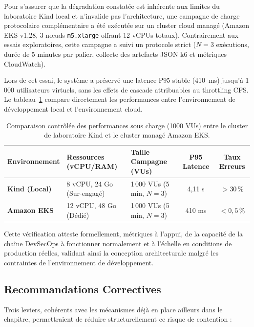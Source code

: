 Pour s'assurer que la dégradation constatée est inhérente aux limites du laboratoire Kind local et n'invalide pas l'architecture, une campagne de charge protocolaire complémentaire a été exécutée sur un cluster cloud managé (Amazon EKS v1.28, 3 nœuds \texttt{m5.xlarge} offrant 12 vCPUs totaux). Contrairement aux essais exploratoires, cette campagne a suivi un protocole strict ($N=3$ exécutions, durée de 5 minutes par palier, collecte des artefacts JSON k6 et métriques CloudWatch). 

Lors de cet essai, le système a préservé une latence P95 stable (410~ms) jusqu'à 1\,000 utilisateurs virtuels, sans les effets de cascade attribuables au throttling CFS. Le tableau~\ref{tab:kind_vs_eks} compare directement les performances entre l'environnement de développement local et l'environnement cloud.

\begin{table}[H]
\centering
\footnotesize
\begin{tabular}{l p{4cm} p{4cm} c c}
\toprule
\textbf{Environnement} & \textbf{Ressources (vCPU/RAM)} & \textbf{Taille Campagne (VUs)} & \textbf{P95 Latence} & \textbf{Taux Erreurs} \\
\midrule
\textbf{Kind (Local)} & 8 vCPU, 24 Go (Sur-engagé) & 1\,000 VUs (5 min, $N=3$) & 4,11 s & $> 30\,\%$ \\
\textbf{Amazon EKS} & 12 vCPU, 48 Go (Dédié) & 1\,000 VUs (5 min, $N=3$) & 410 ms & $< 0,5\,\%$ \\
\bottomrule
\end{tabular}
\caption{Comparaison contrôlée des performances sous charge (1000 VUs) entre le cluster de laboratoire Kind et le cluster managé Amazon EKS.}
\label{tab:kind_vs_eks}
\end{table}

Cette vérification atteste formellement, métriques à l'appui, de la capacité de la chaîne DevSecOps à fonctionner normalement et à l'échelle en conditions de production réelles, validant ainsi la conception architecturale malgré les contraintes de l'environnement de développement.

\subsection{Recommandations Correctives}

Trois leviers, cohérents avec les mécanismes déjà en place ailleurs dans le chapitre, permettraient de réduire structurellement ce risque de contention :

